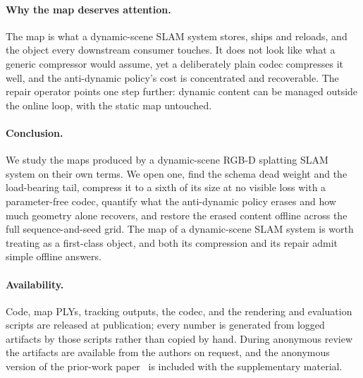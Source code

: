 \documentclass[10pt,twocolumn,letterpaper]{article}
\begin{document}
\paragraph{Why the map deserves attention.}
The map is what a dynamic-scene SLAM system stores, ships and reloads, and the object every
downstream consumer touches. It does not look like what a generic compressor would assume, yet
a deliberately plain codec compresses it well, and the anti-dynamic policy's cost is
concentrated and recoverable. The repair operator points one step further: dynamic content can
be managed outside the online loop, with the static map untouched.

\paragraph{Conclusion.}
We study the maps produced by a dynamic-scene RGB-D splatting SLAM system on their own terms.
We open one, find the schema dead weight and the load-bearing tail, compress it to a sixth of
its size at no visible loss with a parameter-free codec, quantify what the anti-dynamic policy
erases and how much geometry alone recovers, and restore the erased content offline across the
full sequence-and-seed grid. The map of a dynamic-scene SLAM system is worth treating as a
first-class object, and both its compression and its repair admit simple offline answers.

\paragraph{Availability.}
Code, map PLYs, tracking outputs, the codec, and the rendering and evaluation scripts are
released at publication; every number is generated from logged artifacts by those scripts
rather than copied by hand. During anonymous review the artifacts are available from the
authors on request, and the anonymous version of the prior-work paper~\cite{RoGSSLAM} is
included with the supplementary material.



\end{document}

